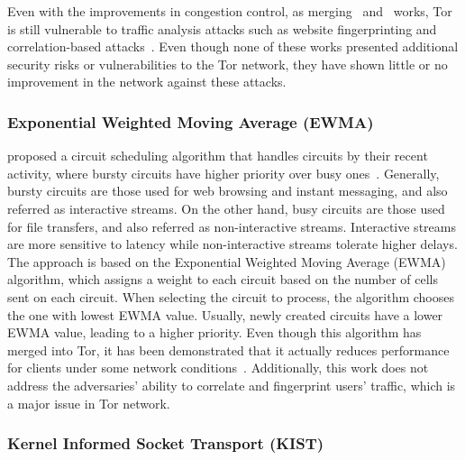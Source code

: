 Even with the improvements in congestion control, as merging~\citeauthor{EWMA} and~\citeauthor{KIST} works, Tor is still vulnerable to traffic analysis attacks such as website fingerprinting and correlation-based attacks~\cite*{KIST}. Even though none of these works presented additional security risks or vulnerabilities to the Tor network, they have shown little or no improvement in the network against these attacks.

\subsubsection{Exponential Weighted Moving Average (EWMA)}\label{subsubsec:exponentialwma}

\citeauthor{EWMA} proposed a circuit scheduling algorithm that handles circuits by their recent activity, where bursty circuits have higher priority over busy ones~\cite{EWMA}. Generally, bursty circuits are those used for web browsing and instant messaging, and also referred as interactive streams. On the other hand, busy circuits are those used for file transfers, and also referred as non-interactive streams. Interactive streams are more sensitive to latency while non-interactive streams tolerate higher delays.
The approach is based on the Exponential Weighted Moving Average (EWMA) algorithm, which assigns a weight to each circuit based on the number of cells sent on each circuit. When selecting the circuit to process, the algorithm chooses the one with lowest EWMA value. Usually, newly created circuits have a lower EWMA value, leading to a higher priority. 
Even though this algorithm has merged into Tor, it has been demonstrated that it actually reduces performance for clients under some network conditions~\cite{shadow-ndss2012}. Additionally, this work does not address the adversaries' ability to correlate and fingerprint users' traffic, which is a major issue in Tor network.

\subsubsection{Kernel Informed Socket Transport (KIST)}\label{subsubsec:kist}


